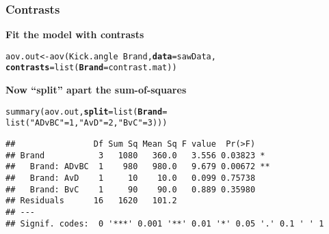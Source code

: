 \documentclass[color=usenames,dvipsnames]{beamer}\usepackage[]{graphicx}\usepackage[]{color}
\makeatletter
\newcommand{\hlnum}[1]{\textcolor[rgb]{0.69,0.494,0}{#1}}%
\newcommand{\hlstr}[1]{\textcolor[rgb]{0.749,0.012,0.012}{#1}}%
\newcommand{\hlopt}[1]{\textcolor[rgb]{0,0,0}{#1}}%
\newcommand{\hlstd}[1]{\textcolor[rgb]{0,0,0}{#1}}%
\newcommand{\hlkwb}[1]{\textcolor[rgb]{0,0.341,0.682}{#1}}%
\newcommand{\hlkwc}[1]{\textcolor[rgb]{0,0,0}{\textbf{#1}}}%
\newcommand{\hlkwd}[1]{\textcolor[rgb]{0.004,0.004,0.506}{#1}}%
\newenvironment{kframe}{%
 \def\at@end@of@kframe{}%
 \ifinner\ifhmode%
  \def\at@end@of@kframe{\end{minipage}}%
  \begin{minipage}{\columnwidth}%
 \fi\fi%
 \def\FrameCommand##1{\hskip\@totalleftmargin \hskip-\fboxsep
 \colorbox{shadecolor}{##1}\hskip-\fboxsep
     \hskip-\linewidth \hskip-\@totalleftmargin \hskip\columnwidth}%
 \MakeFramed {\advance\hsize-\width
   \@totalleftmargin\z@ \linewidth\hsize
   \@setminipage}}%
 {\par\unskip\endMakeFramed%
 \at@end@of@kframe}
\newenvironment{knitrout}{}{} %
\makeatother
\begin{document}





\begin{frame}[fragile]
  \frametitle{Contrasts}
{\bf Fit the model with contrasts}
\begin{footnotesize}
\begin{knitrout}
\color{fgcolor}\begin{kframe}
\begin{alltt}
\hlstd{aov.out} \hlkwb{<-} \hlkwd{aov}\hlstd{(Kick.angle} \hlopt{~} \hlstd{Brand,} \hlkwc{data}\hlstd{=sawData,}
               \hlkwc{contrasts}\hlstd{=}\hlkwd{list}\hlstd{(}\hlkwc{Brand}\hlstd{=contrast.mat))}
\end{alltt}
\end{kframe}
\end{knitrout}
\pause
\vfill
{\bf Now ``split'' apart the sum-of-squares}
\begin{knitrout}
\color{fgcolor}\begin{kframe}
\begin{alltt}
\hlkwd{summary}\hlstd{(aov.out,} \hlkwc{split} \hlstd{=} \hlkwd{list}\hlstd{(}\hlkwc{Brand} \hlstd{=}
                      \hlkwd{list}\hlstd{(}\hlstr{"ADvBC"}\hlstd{=}\hlnum{1}\hlstd{,} \hlstr{"AvD"}\hlstd{=}\hlnum{2}\hlstd{,} \hlstr{"BvC"}\hlstd{=}\hlnum{3}\hlstd{)))}
\end{alltt}
\begin{verbatim}
##                Df Sum Sq Mean Sq F value  Pr(>F)   
## Brand           3   1080   360.0   3.556 0.03823 * 
##   Brand: ADvBC  1    980   980.0   9.679 0.00672 **
##   Brand: AvD    1     10    10.0   0.099 0.75738   
##   Brand: BvC    1     90    90.0   0.889 0.35980   
## Residuals      16   1620   101.2                   
## ---
## Signif. codes:  0 '***' 0.001 '**' 0.01 '*' 0.05 '.' 0.1 ' ' 1
\end{verbatim}
\end{kframe}
\end{knitrout}
\end{footnotesize}
\end{frame}
\end{document}
